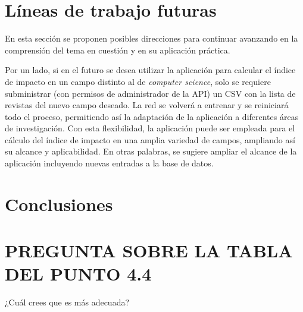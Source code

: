 


\section{Líneas de trabajo futuras}
En esta sección se proponen posibles direcciones para continuar avanzando en la comprensión del tema en cuestión y en su aplicación práctica.

Por un lado, si en el futuro se desea utilizar la aplicación para calcular el índice de impacto en un campo distinto al de \textit{computer science}, solo se requiere subministrar (con permisos de administrador de la API) un CSV con la lista de revistas del nuevo campo deseado. La red se volverá a entrenar y se reiniciará todo el proceso, permitiendo así la adaptación de la aplicación a diferentes áreas de investigación. Con esta flexibilidad, la aplicación puede ser empleada para el cálculo del índice de impacto en una amplia variedad de campos, ampliando así su alcance y aplicabilidad. 
En otras palabras, se sugiere ampliar el alcance de la aplicación incluyendo nuevas entradas a la base de datos.


\section{Conclusiones}






\section{PREGUNTA SOBRE LA TABLA DEL PUNTO 4.4}
¿Cuál crees que es más adecuada?

